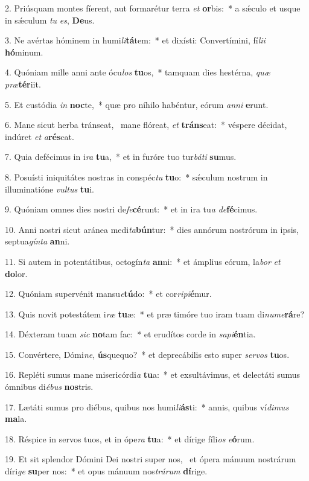 2. Priúsquam montes fíerent, aut formarétur terra \textit{et} \textbf{or}bis:~*  a sǽculo et usque in sǽculum \textit{tu} \textit{es}, \textbf{De}us.\

3. Ne avértas hóminem in humi\textit{li}\textbf{tá}tem:~*  et dixísti: Convertímini, fí\textit{li}\textit{i} \textbf{hó}minum.\

4. Quóniam mille anni ante ócu\textit{los} \textbf{tu}os,~*  tamquam dies hestérna, \textit{quæ} \textit{præ}\textbf{tér}iit.\

5. Et custódia \textit{in} \textbf{noc}te,~*  quæ pro níhilo habéntur, eórum \textit{an}\textit{ni} \textbf{e}runt.\

6. Mane sicut herba tránseat, \dag\  mane flóreat, \textit{et} \textbf{tráns}eat:~*  véspere décidat, indúret \textit{et} \textit{a}\textbf{rés}cat.\

7. Quia defécimus in i\textit{ra} \textbf{tu}a,~*  et in furóre tuo tur\textit{bá}\textit{ti} \textbf{su}mus.\

8. Posuísti iniquitátes nostras in conspéc\textit{tu} \textbf{tu}o:~*  sǽculum nostrum in illuminatióne \textit{vul}\textit{tus} \textbf{tu}i.\

9. Quóniam omnes dies nostri de\textit{fe}\textbf{cé}runt:~*  et in ira tu\textit{a} \textit{de}\textbf{fé}cimus.\

10. Anni nostri sicut aránea medi\textit{ta}\textbf{bún}tur:~*  dies annórum nostrórum in ipsis, septua\textit{gín}\textit{ta} \textbf{an}ni.\

11. Si autem in potentátibus, octogín\textit{ta} \textbf{an}ni:~*  et ámplius eórum, la\textit{bor} \textit{et} \textbf{do}lor.\

12. Quóniam supervénit mansu\textit{e}\textbf{tú}do:~*  et cor\textit{ri}\textit{pi}\textbf{é}mur.\

13. Quis novit potestátem i\textit{ræ} \textbf{tu}æ:~*  et præ timóre tuo iram tuam di\textit{nu}\textit{me}\textbf{rá}re?\

14. Déxteram tuam \textit{sic} \textbf{no}tam fac:~*  et erudítos corde in \textit{sa}\textit{pi}\textbf{én}tia.\

15. Convértere, Dómi\textit{ne}, \textbf{ús}quequo?~*  et deprecábilis esto super \textit{ser}\textit{vos} \textbf{tu}os.\

16. Repléti sumus mane misericórdi\textit{a} \textbf{tu}a:~*  et exsultávimus, et delectáti sumus ómnibus di\textit{é}\textit{bus} \textbf{nos}tris.\

17. Lætáti sumus pro diébus, quibus nos humi\textit{li}\textbf{ás}ti:~*  annis, quibus ví\textit{di}\textit{mus} \textbf{ma}la.\

18. Réspice in servos tuos, et in ópe\textit{ra} \textbf{tu}a:~*  et dírige fíli\textit{os} \textit{e}\textbf{ó}rum.\

19. Et sit splendor Dómini Dei nostri super nos, \dag\  et ópera mánuum nostrárum díri\textit{ge} \textbf{su}per nos:~*  et opus mánuum nos\textit{trá}\textit{rum} \textbf{dí}rige.\

